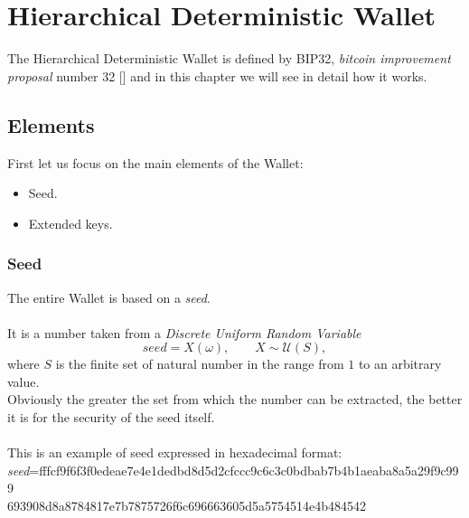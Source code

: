 
\chapter{Hierarchical Deterministic Wallet} %

\label{hd wallet} %



The Hierarchical Deterministic Wallet is defined by BIP32, \textit{bitcoin improvement proposal} number 32 [\cite{1}] and in this chapter we will see in detail how it works.

\section{Elements}
First let us focus on the main elements of the Wallet:
\begin{itemize}[label=$\diamond$]
	\item Seed.
	\item Extended keys.
\end{itemize}

\subsection{Seed}
The entire Wallet is based on a \textit{seed}.
\\ \\
It is a number taken from a \textit{Discrete Uniform Random Variable}
\begin{equation*}
seed=X(\omega), \qquad X\sim \mathcal{U}(S),
\end{equation*}
where $S$ is the finite set of natural number in the range from $1$ to an arbitrary value.\\ Obviously the greater the set from which the number can be extracted, the better it is for the security of the seed itself.
\\ \\
This is an example of seed expressed in hexadecimal format: \\
\textit{seed}=fffcf9f6f3f0edeae7e4e1dedbd8d5d2cfccc9c6c3c0bdbab7b4b1aeaba8a5a29f9c999 \\ 693908d8a8784817e7b7875726f6c696663605d5a5754514e4b484542 

